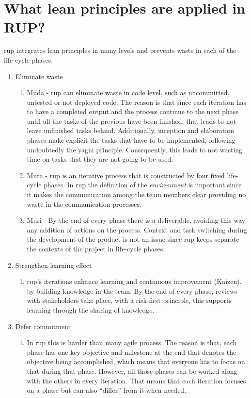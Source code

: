 \section{What lean principles are applied in RUP?}

\ac{rup} integrates lean principles in many levels and prevents waste in each of the life-cycle phases.

\begin{enumerate}

    \item Eliminate waste
    \begin{enumerate}
        \item Muda - \ac{rup} can eliminate waste in code level, such as uncommitted, untested or not deployed code. The reason is that since each iteration has to have a completed output and the process continue to the next phase until all the tasks of the previous have been finished, that leads to not leave unfinished tasks behind.
        Additionally, inception and elaboration phases make explicit the tasks that have to be implemented, following undoubtedly the \ac{yagni} principle. Consequently, this leads to not wasting time on tasks that they are not going to be used.
        \item Mura - \ac{rup} is an iterative process that is constructed by four fixed life-cycle phases. In \ac{rup} the definition of the \textit{environment} is important since it makes the communication among the team members clear providing no waste in the communication processes.
        \item Muri - By the end of every phase there is a deliverable, avoiding this way any addition of actions on the process. Context and task switching during the development of the product is not an issue since \ac{rup} keeps separate the contexts of the project in life-cycle phases.
    \end{enumerate}
    
    \item Strengthen learning effect
    \begin{enumerate}
        \item \ac{rup}'s iterations enhance learning and continuous improvement (Kaizen), by building knowledge in the team. By the end of every phase, reviews with stakeholders take place, with a risk-first principle, this supports learning through the sharing of knowledge.
    \end{enumerate}
    
    \item Defer commitment
    \begin{enumerate}
        \item In \ac{rup} this is harder than many agile process. The reason is that, each phase has one key objective and milestone at the end that denotes the objective being accomplished, which means that everyone has to focus on that during that phase. However, all those phases can be worked along with the others in every iteration. That means that each iteration focuses on a phase but can also ``differ'' from it when needed.
    \end{enumerate}
    

\end{enumerate}
